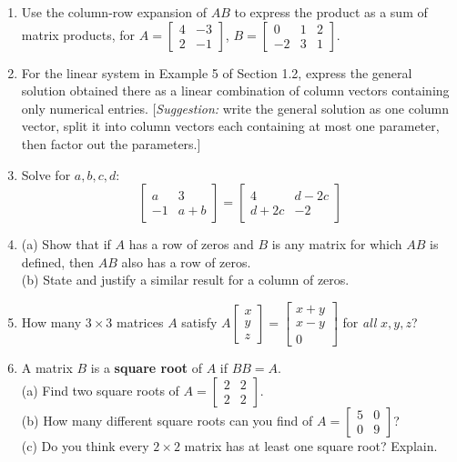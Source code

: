 \documentclass{article}
\theoremstyle{mystyle}
\begin{document}
\begin{enumerate}
    \item[17.] Use the column-row expansion of $AB$ to express the product as a sum of matrix products, for $A=\begin{bmatrix}4&-3\\2&-1\end{bmatrix}$, $B=\begin{bmatrix}0&1&2\\-2&3&1\end{bmatrix}$.

    \item[21.] For the linear system in Example 5 of Section 1.2, express the general solution obtained there as a linear combination of column vectors containing only numerical entries. [\emph{Suggestion:} write the general solution as one column vector, split it into column vectors each containing at most one parameter, then factor out the parameters.]

    \item[23.] Solve for $a,b,c,d$:
    \[
    \begin{bmatrix}a&3\\-1&a+b\end{bmatrix}=\begin{bmatrix}4&d-2c\\d+2c&-2\end{bmatrix}
    \]

    \item[25.] (a) Show that if $A$ has a row of zeros and $B$ is any matrix for which $AB$ is defined, then $AB$ also has a row of zeros.\\
    (b) State and justify a similar result for a column of zeros.

    \item[27.] How many $3\times3$ matrices $A$ satisfy $A\begin{bmatrix}x\\y\\z\end{bmatrix}=\begin{bmatrix}x+y\\x-y\\0\end{bmatrix}$ for \emph{all} $x,y,z$?

    \item[29.] A matrix $B$ is a \textbf{square root} of $A$ if $BB=A$.\\
    (a) Find two square roots of $A=\begin{bmatrix}2&2\\2&2\end{bmatrix}$.\\
    (b) How many different square roots can you find of $A=\begin{bmatrix}5&0\\0&9\end{bmatrix}$?\\
    (c) Do you think every $2\times2$ matrix has at least one square root? Explain.


\end{enumerate}
\end{document}
